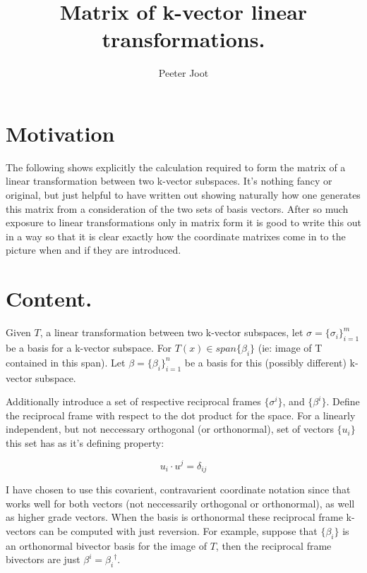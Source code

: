 \documentclass{article}      %
\title{ Matrix of k-vector linear transformations. } %
\author{Peeter Joot}         %
\begin{document}

\maketitle{}

\section{ Motivation }

The following shows explicitly the calculation required to form the matrix of a linear transformation between two k-vector subspaces.  It's nothing fancy or original, but just helpful
to have written out showing naturally how one generates this matrix from a consideration of the two sets of basis vectors.  After so much exposure to linear transformations only in matrix
form it is good to write this out in a way so that it is clear exactly how the coordinate matrixes come in to the picture when and if they are introduced.

\section{ Content. }

Given $T$, a linear transformation between two k-vector subspaces,
let $\sigma = \{\sigma_i\}_{i=1}^m$ be a basis for a k-vector subspace.
For $T(x) \in span\{ \beta_i \}$ (ie: image of T contained in this span).  Let $\beta = \{\beta_i\}_{i=1}^n$ be a basis for this (possibly different) k-vector subspace.

Additionally introduce a set of respective reciprocal frames $\{\sigma^i\}$, and $\{\beta^i\}$.
Define the reciprocal frame with respect to the dot product for the space.  For a linearly independent, but not neccessary orthogonal (or orthonormal), set of vectors $\{u_i\}$ this set 
has as it's defining property:

\[
u_i \cdot u^j = \delta_{ij}
\]

I have chosen to use this covarient, contravarient coordinate notation since that works well for both vectors (not neccessarily orthogonal or orthonormal), as well as higher grade vectors.  When the basis is orthonormal these reciprocal frame k-vectors can be computed with just reversion.  For example, suppose that $\{\beta_i\}$ is an orthonormal bivector basis for the image of $T$, then the reciprocal frame bivectors are just $\beta^i = {\beta_i}^\dagger$.
\end{document}
